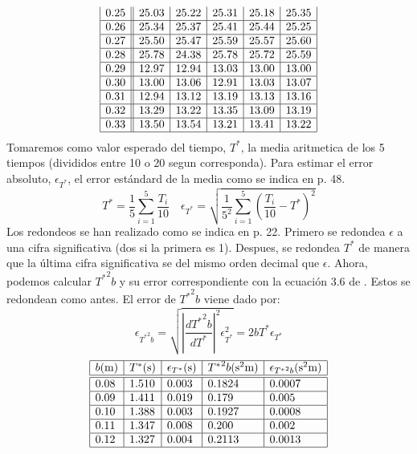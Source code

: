 \documentclass{article}
\begin{document}
\begin{multicols}{2}
$$\begin{array}{|c||c|c|c|c|c|}
        0.25 & 25.03 & 25.22 & 25.31 & 25.18 & 25.35  \\ \hline
        0.26 & 25.34 & 25.37 & 25.41 & 25.44 & 25.25  \\ \hline
        0.27 & 25.50 & 25.47 & 25.59 & 25.57 & 25.60  \\ \hline
        0.28 & 25.78 & 24.38 & 25.78 & 25.72 & 25.59  \\ \hline
        0.29 & 12.97 & 12.94 & 13.03 & 13.00 & 13.00  \\ \hline
        0.30 & 13.00 & 13.06 & 12.91 & 13.03 & 13.07  \\ \hline
        0.31 & 12.94 & 13.12 & 13.19 & 13.13 & 13.16  \\ \hline
        0.32 & 13.29 & 13.22 & 13.35 & 13.09 & 13.19  \\ \hline
        0.33 & 13.50 & 13.54 & 13.21 & 13.41 & 13.22  \\ \hline
    \end{array}
$$
Tomaremos como valor esperado del tiempo, $T^*$, la media aritmetica de los 5 tiempos (divididos entre 10 o 20 segun corresponda). Para estimar el error absoluto, $\epsilon_{T^*}$, el error estándard de la media como se indica en \cite{manual} p. 48.
$$
T^* = \frac{1}{5} \sum_{i=1}^5 \frac{T_i}{10} \quad
\epsilon_{T^*} = \sqrt{\frac{1}{5^2} \sum_{i=1}^5 (\frac{T_i}{10} - T^*)^2}
$$
Los redondeos se han realizado como se indica en \cite{manual} p. 22. Primero se redondea $\epsilon$ a una cifra significativa (dos si la primera es 1). Despues, se redondea $T^*$ de manera que la última cifra significativa se del mismo orden decimal que $\epsilon$. Ahora, podemos calcular ${T^*}^2b$ y su error correspondiente con la ecuación 3.6 de \cite{manual}. Estos se redondean como antes. El error de ${T^*}^2b$ viene dado por:
$$
\epsilon_{{T^*}^2b} =
\sqrt{\left| \frac{d {T^*}^2b}{d T^*} \right|^2 \epsilon_{T^*}^2}=
2bT^* \epsilon_{T^*}
$$
$$
  \begin{array}{|l|l|l|l|l|} \hline
    b\text{(m)} & T^*\text{(s)} & \epsilon_{T^*}\text{(s)} & {T^*}^2b\text{(s\textsuperscript{2}m)} & \epsilon_{{T^*}^2b}\text{(s\textsuperscript{2}m)}\\ \hline \hline
    0.08 & 1.510 & 0.003 & 0.1824 & 0.0007  \\ \hline
    0.09 & 1.411 & 0.019 & 0.179 & 0.005  \\ \hline
    0.10 & 1.388 & 0.003 & 0.1927 & 0.0008  \\ \hline
    0.11 & 1.347 & 0.008 & 0.200 & 0.002  \\ \hline
    0.12 & 1.327 & 0.004 & 0.2113 & 0.0013  \\ \hline

\end{array}$$
\end{multicols}
\end{document}
